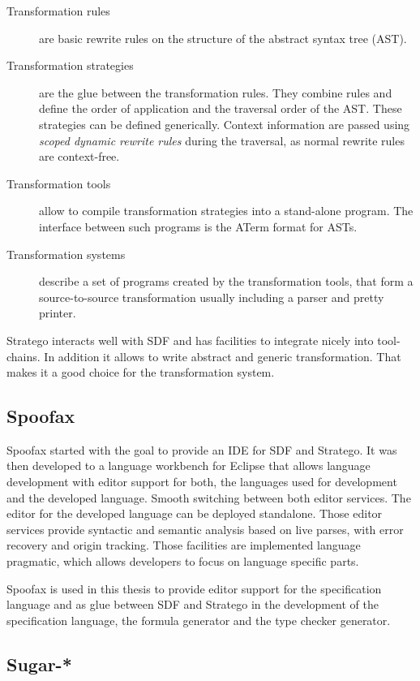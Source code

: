 \begin{description}
\item[Transformation rules] are basic rewrite rules on the structure
  of the abstract syntax tree (AST).
\item[Transformation strategies] are the glue between the
  transformation rules. They combine rules and define the order of
  application and the traversal order of the AST. These strategies can
  be defined generically. Context information are passed using
  \textit{scoped dynamic rewrite rules} during the traversal, as
  normal rewrite rules are context-free.
\item[Transformation tools] allow to compile transformation strategies
  into a stand-alone program. The interface between such programs is
  the ATerm format for ASTs.
\item[Transformation systems] describe a set of programs created by
  the transformation tools, that form a source-to-source
  transformation usually including a parser and pretty printer.
\end{description}


Stratego interacts well with SDF and has facilities to integrate
nicely into tool-chains. In addition it allows to write abstract and
generic transformation. That makes it a good choice for the
transformation system.
\subsection{Spoofax}
Spoofax started with the goal to provide an IDE for SDF and
Stratego. It was then developed to a language workbench for Eclipse
that allows language development with editor support for both, the
languages used for development and the developed language. Smooth
switching between both editor services. The editor for the developed
language can be deployed standalone. Those editor services provide
syntactic and semantic analysis based on live parses, with error
recovery and origin tracking. Those facilities are implemented
language pragmatic, which allows developers to focus on language
specific parts.

Spoofax is used in this thesis to provide editor support for the
specification language and as glue between SDF and Stratego in the
development of the specification language, the formula generator and
the type checker generator.
\subsection{Sugar-*}
